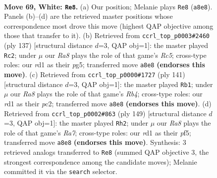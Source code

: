 \documentclass[11pt]{article}
\begin{document}
\clearpage

\begin{figure}[p]\centering
\begin{subfigure}{0.46\textwidth}\centering
\resizebox{\linewidth}{!}{%
\newchessgame
\chessboard[
  setfen={R7/6k1/8/8/5K2/1r6/7P/3r4 w - - 5 69},
  showmover=false,
  pgfstyle=straightmove, color=movearrow, markmove={a8-e8}
]}
\caption{}
\end{subfigure}\hfill
\begin{subfigure}{0.46\textwidth}\centering
\resizebox{\linewidth}{!}{%
\newchessgame
\chessboard[
  setfen={8/1k5p/3R4/6P1/2r5/6K1/8/8 b - - 0 69},
  showmover=false,
  pgfstyle=straightmove, color=movearrow, markmove={c4-c2}
]}
\caption{}
\end{subfigure}
\\[4pt]
\begin{subfigure}{0.46\textwidth}\centering
\resizebox{\linewidth}{!}{%
\newchessgame
\chessboard[
  setfen={8/6R1/8/1r6/4K2p/8/2P4k/8 b - - 0 71},
  showmover=false,
  pgfstyle=straightmove, color=movearrow, markmove={b5-b1}
]}
\caption{}
\end{subfigure}\hfill
\begin{subfigure}{0.46\textwidth}\centering
\resizebox{\linewidth}{!}{%
\newchessgame
\chessboard[
  setfen={8/3k4/8/3p1P2/8/5K2/r7/2R5 b - - 0 75},
  showmover=false,
  pgfstyle=straightmove, color=movearrow, markmove={a2-h2}
]}
\caption{}
\end{subfigure}
\caption{\textbf{Move 69, White: \texttt{Re8}.} (a) Our position; Melanie plays \texttt{Re8} (\texttt{a8e8}). Panels (b)--(d) are the retrieved master positions whose correspondence most drove this move (highest QAP objective among those that transfer to it). (b) Retrieved from \texttt{ccrl\_top\_p0003\#2460} (ply 137) [structural distance $d$=3, QAP obj=1]: the master played \texttt{Rc2}; under $\mu$ our \emph{Ra8} plays the role of that game's \emph{Rc5}; cross-type roles: our \emph{r}d1 as their \emph{p}g5; transferred move \texttt{a8e8} \textbf{(endorses this move)}. (c) Retrieved from \texttt{ccrl\_top\_p0000\#1727} (ply 141) [structural distance $d$=3, QAP obj=1]: the master played \texttt{Rb1}; under $\mu$ our \emph{Ra8} plays the role of that game's \emph{Rb4}; cross-type roles: our \emph{r}d1 as their \emph{p}c2; transferred move \texttt{a8e8} \textbf{(endorses this move)}. (d) Retrieved from \texttt{ccrl\_top\_p0002\#863} (ply 149) [structural distance $d$=3, QAP obj=1]: the master played \texttt{Rh2}; under $\mu$ our \emph{Ra8} plays the role of that game's \emph{Ra7}; cross-type roles: our \emph{r}d1 as their \emph{p}f5; transferred move \texttt{a8e8} \textbf{(endorses this move)}. Synthesis: 3 retrieved analogs transferred to \texttt{Re8} (summed QAP objective 3, the strongest correspondence among the candidate moves); Melanie committed it via the \texttt{search} selector.}
\label{fig:thought-m136}
\end{figure}
\end{document}
